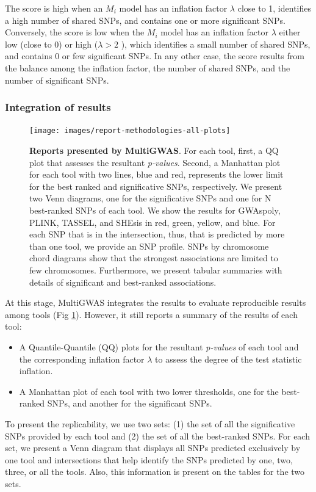 \documentclass{article}
\begin{document}
The score is high when an $M_{i}$ model has an inflation factor $\lambda$ close to 1, identifies a high number of shared SNPs, and contains one or more significant SNPs. Conversely, the score is low when the $M_{i}$ model has an inflation factor $\lambda$ either low (close to 0) or high ($\lambda>2$ ), which identifies a small number of shared SNPs, and contains 0 or few significant SNPs. In any other case, the score results from the balance among the inflation factor, the number of shared SNPs, and the number of significant SNPs.


\subsubsection{Integration of results}

\begin{figure}
\texttt{[image: images/report-methodologies-all-plots]} \caption{\textbf{Reports presented by MultiGWAS}. For each tool, first, a QQ plot that assesses the resultant \emph{p-values}. Second, a Manhattan plot for each tool with two lines, blue and red, represents the lower limit for the best ranked and significative SNPs, respectively. We present two Venn diagrams, one for the significative SNPs and one for N best-ranked SNPs of each tool. We show the results for GWAspoly, PLINK, TASSEL, and SHEsis in red, green, yellow, and blue. For each SNP that is in the intersection, thus, that is predicted by more than one tool, we provide an SNP profile. SNPs by chromosome chord diagrams show that the strongest associations are limited to few chromosomes. Furthermore, we present tabular summaries with details of significant and best-ranked associations.\label{fig: Reports} }
\end{figure}
At this stage, MultiGWAS integrates the results to evaluate reproducible results among tools (Fig \ref{fig: Reports}). However, it still reports a summary of the results of each tool: 
\begin{itemize}
\item A Quantile-Quantile (QQ) plots for the resultant \emph{p-values} of each tool and the corresponding inflation factor $\lambda$ to assess the degree of the test statistic inflation. 
\item A Manhattan plot of each tool with two lower thresholds, one for the best-ranked SNPs, and another for the significant SNPs. 
\end{itemize}
To present the replicability, we use two sets: (1) the set of all the significative SNPs provided by each tool and (2) the set of all the best-ranked SNPs. For each set, we present a Venn diagram that displays all SNPs predicted exclusively by one tool and intersections that help identify the SNPs predicted by one, two, three, or all the tools. Also, this information is present on the tables for the two sets.
\end{document}
